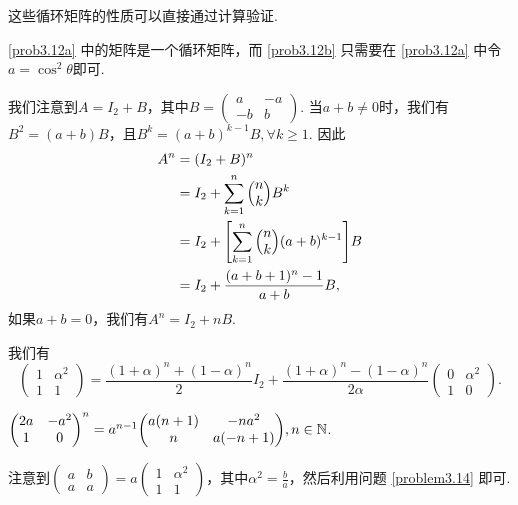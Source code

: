 \begin{solution}
  这些循环矩阵的性质可以直接通过计算验证.
\end{solution}

\begin{solution}
  \ref{prob3.12a} 中的矩阵是一个循环矩阵，而 \ref{prob3.12b} 只需要在 \ref{prob3.12a} 中令$a=\cos^2\theta$即可.
\end{solution}

\begin{solution}
  我们注意到$A=I_2+B$，其中$B=\begin{pmatrix}
    a & - a\\
    -b & b
  \end{pmatrix}$. 当$a+b\ne0$时，我们有$B^2=(a+b)B$，且$B^k=(a+b)^{k-1}B,\forall k\ge1$. 因此
  \begin{align*}
    A^n & = (I_2 + B)^n \\
    & = I_2 + \sum_{k=1}^n \Binom nk B^k \\
    & = I_2 + \left[
      \sum_{k=1}^n\Binom nk (a + b)^{k-1}
    \right]B \\
    & = I_2 + \frac{(a+b+1)^n-1}{a+b}B,
  \end{align*}
  如果$a+b=0$，我们有$A^n=I_2+nB$.
\end{solution}

\begin{solution}
  我们有
  \[
    \begin{pmatrix}
      1 & \alpha^2 \\
      1 & 1
    \end{pmatrix} = \frac{(1+\alpha)^n+(1-\alpha)^n}2I_2 +
    \frac{(1+\alpha)^n-(1-\alpha)^n}{2\alpha}
    \begin{pmatrix}
      0 & \alpha^2 \\
      1 & 0
    \end{pmatrix}.
  \]
\end{solution}

\begin{solution}
  $\begin{pmatrix}
    2a & -a^2 \\
    1 & 0
  \end{pmatrix}^n=a^{n-1}\begin{pmatrix}
    a(n+1) & -na^2 \\
    n & a(-n+1)
  \end{pmatrix},n\in\MN$.
\end{solution}

\begin{solution}
  注意到$\begin{pmatrix}
    a & b \\
    a & a
  \end{pmatrix}=a\begin{pmatrix}
    1 & \alpha^2 \\
    1 & 1
  \end{pmatrix}$，其中$\alpha^2=\frac ba$，然后利用问题 \ref{problem3.14} 即可.
\end{solution}

